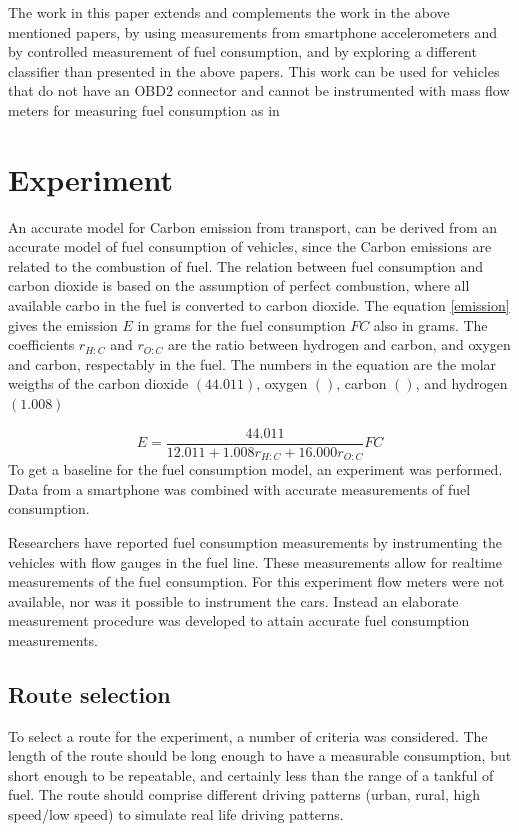 \documentclass[conference]{IEEEtran}
\begin{document}
The work in this paper extends and complements the work in the above mentioned papers, by using measurements from smartphone accelerometers and by controlled measurement of fuel consumption, and by exploring a different classifier than presented in the above papers. This work can be used for vehicles that do not have an OBD2 connector and cannot be instrumented with mass flow meters for measuring fuel consumption as in \cite{haan2000,Honicky}

%
%
%
\section{Experiment}
\label{sec:experiment}
An accurate model for Carbon emission from transport, can be derived from an accurate model of fuel consumption of vehicles, since the Carbon emissions are related to the combustion of fuel. The relation between fuel consumption and carbon dioxide is based on the assumption of perfect combustion, where all available carbo in the fuel is converted to carbon dioxide. The equation \ref{emission} gives the emission $E$ in grams for the fuel consumption $FC$ also in grams. The coefficients $r_{H:C}$ and $r_{O:C}$ are the ratio between hydrogen and carbon, and   oxygen and carbon, respectably in the fuel. The numbers in the equation are the molar weigths of the carbon dioxide $(44.011)$, oxygen $()$, carbon $()$, and hydrogen $(1.008)$

\begin{equation}
     E = \frac{44.011}{12.011+1.008 r_{H:C}+16.000 r_{O:C}} FC
     \label{emission}
\end{equation}
To get a baseline for the fuel consumption model, an experiment was performed. Data from a smartphone was combined with accurate measurements of fuel consumption. 

Researchers have reported fuel consumption measurements by instrumenting the vehicles with flow gauges in the fuel line. These measurements allow for realtime measurements of the fuel consumption. For this experiment flow meters were not available, nor was it possible to instrument the cars. Instead an elaborate measurement procedure was developed to attain accurate fuel consumption measurements.

\subsection{Route selection}
To select a route for the experiment, a number of criteria was considered. The length of the route should be long enough to have a measurable consumption, but short enough to be repeatable, and certainly less than the range of a tankful of fuel. The route should comprise different driving patterns (urban, rural, high speed/low speed) to simulate real life driving patterns. 
\end{document}
